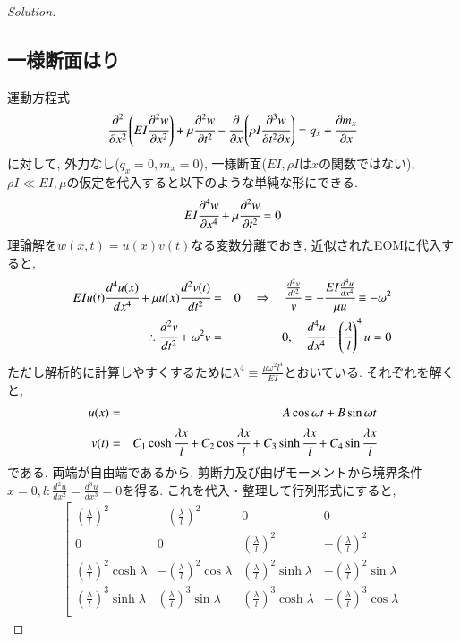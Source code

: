 \documentclass[12pt]{jsarticle}
\newenvironment{solution}
  {\renewcommand\qedsymbol{$\blacksquare$}\begin{proof}[Solution]}
  {\end{proof}}
\begin{document}
\begin{solution}
\subsection*{一様断面はり}
運動方程式
\begin{eqnarray*}
\cfrac{\partial^2}{\partial x^2}\left(EI\cfrac{\partial^2 w}{\partial x^2} \right) + \mu\cfrac{\partial^2 w}{\partial t^2} - \cfrac{\partial}{\partial x}\left(\rho I\cfrac{\partial^3 w}{\partial t^2\partial x} \right) = q_x + \cfrac{\partial m_x}{\partial x}
\end{eqnarray*}
に対して, 外力なし($q_x=0, m_x=0$), 一様断面($EI, \rho I$は$x$の関数ではない), $\rho I \ll EI, \mu$の仮定を代入すると以下のような単純な形にできる.
\begin{eqnarray*}
EI\cfrac{\partial^4 w}{\partial x^4} + \mu\cfrac{\partial^2 w}{\partial t^2} = 0
\end{eqnarray*}
理論解を$w(x,t)=u(x)v(t)$なる変数分離でおき, 近似されたEOMに代入すると,
\begin{eqnarray*}
EIu(t)\cfrac{d^4 u(x)}{d x^4} + \mu u(x)\cfrac{d^2 v(t)}{dt^2} &=& 0
\quad \Rightarrow \quad \cfrac{\frac{d^2 v}{dt^2}}{v} = -\cfrac{EI\frac{d^4 u}{dx^4}}{\mu u} \equiv -\omega^2 \\
\therefore \cfrac{d^2 v}{dt^2} + \omega^2 v &=& 0, \quad \cfrac{d^4 u}{dx^4} - \left(\cfrac{\lambda}{l} \right)^4 u = 0
\end{eqnarray*}
ただし解析的に計算しやすくするために$\lambda^4 \equiv \frac{\mu \omega^2 l^4}{EI}$とおいている. それぞれを解くと,
\begin{eqnarray*}
u(x) &=& A\cos\omega t + B\sin\omega t \\
v(t) &=& C_1\cosh\cfrac{\lambda x}{l} + C_2\cos\cfrac{\lambda x}{l} + C_3\sinh\cfrac{\lambda x}{l} + C_4\sin\cfrac{\lambda x}{l}
\end{eqnarray*}
である. 両端が自由端であるから, 剪断力及び曲げモーメントから境界条件$x=0, l: \frac{d^2 u}{dx^2} = \frac{d^3 u}{dx^3} = 0$を得る. これを代入・整理して行列形式にすると,
\begin{eqnarray*}
\left[
\begin{array}{cccc}
(\frac{\lambda}{l})^2 & -(\frac{\lambda}{l})^2 & 0 & 0 \\
0 & 0 & (\frac{\lambda}{l})^2 & -(\frac{\lambda}{l})^2 \\
(\frac{\lambda}{l})^2\cosh\lambda & -(\frac{\lambda}{l})^2\cos\lambda & (\frac{\lambda}{l})^2\sinh\lambda & -(\frac{\lambda}{l})^2\sin\lambda \\
(\frac{\lambda}{l})^3\sinh\lambda & (\frac{\lambda}{l})^3\sin\lambda & (\frac{\lambda}{l})^3\cosh\lambda & -(\frac{\lambda}{l})^3\cos\lambda \\

\end{array}
\end{eqnarray*}
\end{solution}
\end{document}
